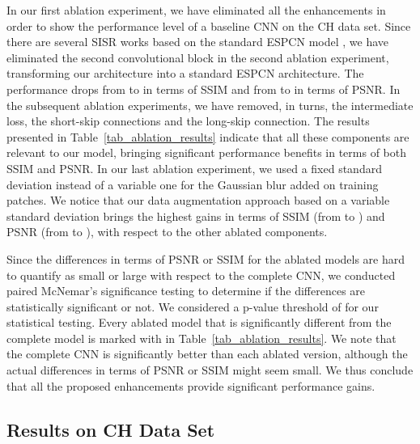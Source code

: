 \documentclass{ieeeaccess}
\begin{document}
In our first ablation experiment, we have eliminated all the enhancements in order to show the performance level of a baseline CNN on the CH data set. Since there are several SISR works \cite{Du-AS-2019, Hatvani-TRPMS-2018, Yu-ICIP-2017, Zhao-TMI-2019} based on the standard ESPCN model \cite{Shi-CVPR-2016}, we have eliminated the second convolutional block in the second ablation experiment, transforming our architecture into a standard ESPCN architecture. The performance drops from  to  in terms of SSIM and from  to  in terms of PSNR. In the subsequent ablation experiments, we have removed, in turns, the intermediate loss, the short-skip connections and the long-skip connection. The results presented in Table~\ref{tab_ablation_results} indicate that all these components are relevant to our model, bringing significant performance benefits in terms of both SSIM and PSNR. In our last ablation experiment, we used a fixed standard deviation instead of a variable one for the Gaussian blur added on training patches. We notice that our data augmentation approach based on a variable standard deviation brings the highest gains in terms of SSIM (from  to ) and PSNR (from  to ), with respect to the other ablated components. 

Since the differences in terms of PSNR or SSIM for the ablated models are hard to quantify as small or large with respect to the complete CNN, we conducted paired McNemar's significance testing \cite{Dietterich-NC-1998} to determine if the differences are statistically significant or not. We considered a p-value threshold of  for our statistical testing. Every ablated model that is significantly different from the complete model is marked with  in Table~\ref{tab_ablation_results}. We note that the complete CNN is significantly better than each ablated version, although the actual differences in terms of PSNR or SSIM might seem small. We thus conclude that all the proposed enhancements provide significant performance gains.

\subsection{Results on CH Data Set}
\end{document}
